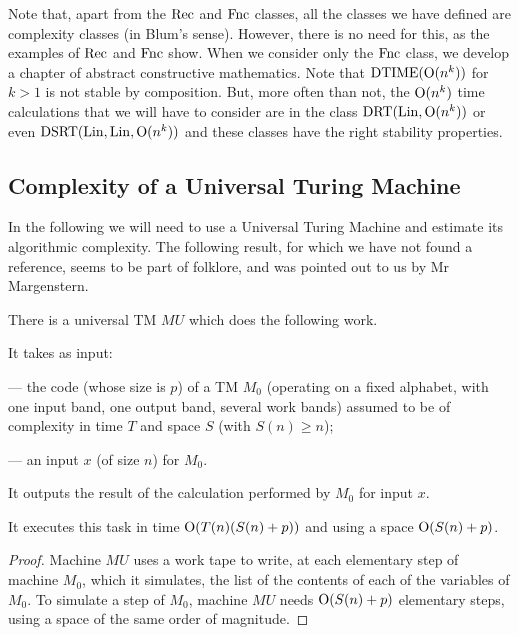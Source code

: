 
\smallskip Note that, apart from the ${\rm Rec}$ and ${\rm Fnc}$ classes, all the classes we have defined are complexity classes (in Blum's sense). However, there is no need for this, as the examples of ${\rm Rec}$ and ${\rm Fnc}$ show. When we consider only the ${\rm Fnc}$ class, we develop a chapter of abstract constructive mathematics.
 Note that ${\rm DTIME} ({\rm O}(n^k))$ for $k > 1$ is not stable by composition. But, more often than not, the ${\rm O}(n^k)$ time calculations that we will have to consider are in the class ${\rm DRT}({\rm Lin}, {\rm O}(n^k))$ or even ${\rm DSRT}({\rm Lin}, {\rm Lin}, {\rm O}(n^k))$ and these classes have the right stability properties.

\subsection{Complexity of a Universal Turing Machine}\label{subsec13} 
In the following we will need to use a Universal Turing Machine and estimate its algorithmic complexity. 
The following result, for which we have not found a reference, seems to be part of folklore, and was pointed out to us by Mr Margenstern.

\begin{lemma} \label{131} 
There is a universal TM $MU$ which does the following work.

\noindent 
It takes as input:

\noindent 
--- the code (whose size is $p$) of a TM $M_0$ (operating on a fixed alphabet, with one input band, one output band, several work bands) assumed to be of complexity in time $T$ and space $S$ (with $S(n) \geq n$);

\noindent 
--- an input $x$ (of size $n$) for $M_0$.

\noindent 
It outputs the result of the calculation performed by $M_0$ for input $x$.

\noindent 
It executes this task in time ${\rm O}(T(n)(S(n)+p))$ and using a space ${\rm O}(S(n)+p)$.
\end{lemma} 

\begin{proof} 
Machine $MU$ uses a work tape to write, at each elementary step of machine $M_0$, which it simulates, the list of the contents of each of the variables of $M_0.$ To simulate a step of $M_0$, machine $MU$ needs ${\rm O}(S(n)+p)$ elementary steps, using a space of the same order of magnitude. 
\end{proof}


